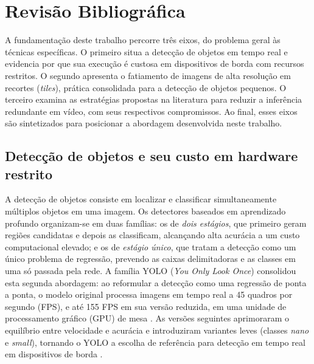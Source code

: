 \documentclass{ieeeaccess}
\begin{document}
\section{Revisão Bibliográfica}
\label{sec:revisao}

A fundamentação deste trabalho percorre três eixos, do problema geral às técnicas
específicas. O primeiro situa a detecção de objetos em tempo real e evidencia por
que sua execução é custosa em dispositivos de borda com recursos restritos. O segundo apresenta o
fatiamento de imagens de alta resolução em recortes (\textit{tiles}), prática
consolidada para a detecção de objetos pequenos. O terceiro examina as estratégias
propostas na literatura para reduzir a inferência redundante em vídeo, com seus
respectivos compromissos. Ao final, esses eixos são sintetizados para posicionar a abordagem desenvolvida neste trabalho.

\subsection{Detecção de objetos e seu custo em hardware restrito}
\label{subsec:deteccao_custo}

A detecção de objetos consiste em localizar e classificar simultaneamente
múltiplos objetos em uma imagem. Os detectores baseados em aprendizado
profundo organizam-se em duas famílias: os de \textit{dois estágios}, que
primeiro geram regiões candidatas e depois as classificam, alcançando alta
acurácia a um custo computacional elevado; e os de \textit{estágio único},
que tratam a detecção como um único problema de regressão, prevendo as caixas
delimitadoras e as classes em uma só passada pela rede. A família YOLO
(\textit{You Only Look Once}) consolidou esta segunda abordagem: ao reformular
a detecção como uma regressão de ponta a ponta, o modelo original processa
imagens em tempo real a 45 quadros por segundo (FPS), e até 155 FPS em sua
versão reduzida, em uma unidade de processamento gráfico (GPU) de mesa \cite{redmon2016yolo}. As versões
seguintes aprimoraram o equilíbrio entre velocidade e acurácia e introduziram
variantes leves (classes \textit{nano} e \textit{small}), tornando o YOLO a
escolha de referência para detecção em tempo real em dispositivos de borda
\cite{terven2023yolo}.
\end{document}
